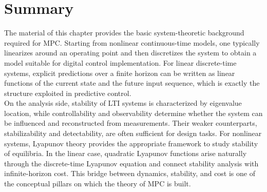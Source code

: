 \section{Summary}

The material of this chapter provides the basic system-theoretic background required for MPC. Starting from nonlinear continuous-time models, one typically linearizes around an operating point and then discretizes the system to obtain a model suitable for digital control implementation. For linear discrete-time systems, explicit predictions over a finite horizon can be written as linear functions of the current state and the future input sequence, which is exactly the structure exploited in predictive control.\\
On the analysis side, stability of LTI systems is characterized by eigenvalue location, while controllability and observability determine whether the system can be influenced and reconstructed from measurements. Their weaker counterparts, stabilizability and detectability, are often sufficient for design tasks. For nonlinear systems, Lyapunov theory provides the appropriate framework to study stability of equilibria. In the linear case, quadratic Lyapunov functions arise naturally through the discrete-time Lyapunov equation and connect stability analysis with infinite-horizon cost. This bridge between dynamics, stability, and cost is one of the conceptual pillars on which the theory of MPC is built.
